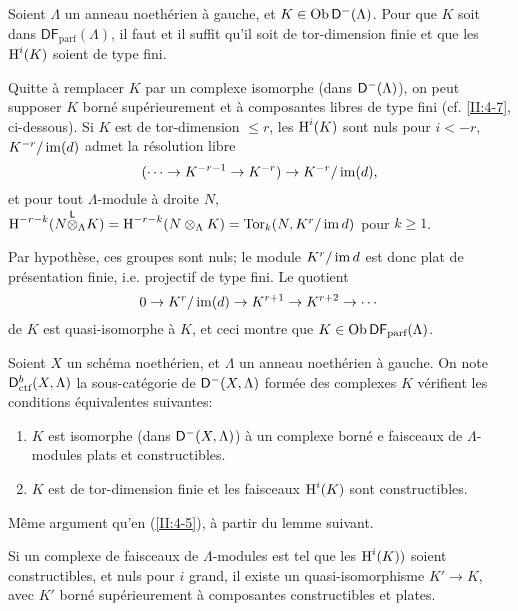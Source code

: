 \documentclass[oneside]{book}
\begin{document}
\begin{lemma}\label{II:4-5-1} 
Soient $\Lambda$ un anneau noethérien à gauche, et $K\in\operatorname{Ob}\mathsf{D}^-(\Lambda)$. 
Pour que $K$ soit dans $\mathsf{DF}_\text{parf}(\Lambda)$, il faut et il suffit 
qu'il soit de tor-dimension finie et que les $\operatorname{H}^i(K)$ soient de type fini.
\end{lemma}

Quitte à remplacer $K$ par un complexe isomorphe (dans $\mathsf{D}^-(\Lambda)$), on 
peut supposer $K$ borné supérieurement et à composantes libres de type 
fini (cf. \ref{II:4-7}, ci-dessous). Si $K$ est de tor-dimension $\leqslant r$, 
les $\operatorname{H}^i(K)$ sont nuls pour $i<-r$, $K^{-r}/\operatorname{im}(d)$ admet la résolution 
libre 
\[
  (\cdots \to K^{-r-1} \to K^{-r}) \to K^{-r}/\operatorname{im}(d) \text{,}
\]
et pour tout $\Lambda$-module à droite $N$, 
$\operatorname{H}^{-r-k}(N{\overset{\mathsf{L}}{\otimes}}_\Lambda K) = \operatorname{H}^{-r-k}(N\otimes_\Lambda K) 
= \operatorname{Tor}_k(N,K^r/\operatorname{im} d)$ pour $k\geqslant 1$. 

Par hypothèse, ces groupes sont nuls; le module $K^r/\operatorname{im} d$ est donc plat de 
présentation finie, i.e. projectif de type fini. Le quotient 
\[
  0 \to K^r/\operatorname{im}(d) \to K^{r+1} \to K^{r+2}\to \cdots 
\]
de $K$ est quasi-isomorphe à $K$, et ceci montre que 
$K\in\operatorname{Ob}\mathsf{DF}_\text{parf}(\Lambda)$. 





\begin{prop-def_}\label{II:4-6}
Soient $X$ un sch\'ema noeth\'erien, et $\Lambda$ un anneau noeth\'erien \`a 
gauche. On note $\mathsf{D}_\textnormal{ctf}^b(X,\Lambda)$ la sous-cat\'egorie de 
$\mathsf{D}^-(X,\Lambda)$ form\'ee des complexes $K$ v\'erifient les conditions 
\'equivalentes suivantes:
\begin{enumerate}[\indent i)]
  \item $K$ est isomorphe (dans $\mathsf{D}^-(X,\Lambda)$) \`a un complexe born\'e e 
    faisceaux de $\Lambda$-modules plats et constructibles. 
  \item $K$ est de tor-dimension finie et les faisceaux $\operatorname{H}^i(K)$ sont 
    constructibles. 
\end{enumerate}
\end{prop-def_}

M\^eme argument qu'en (\ref{II:4-5}), \`a partir du lemme suivant. 





\begin{lemma_}\label{II:4-7}
Si un complexe de faisceaux de $\Lambda$-modules est tel que les $\operatorname{H}^i(K))$ 
soient constructibles, et nuls pour $i$ grand, il existe un 
quasi-isomorphisme $K'\to K$, avec $K'$ born\'e sup\'erieurement \`a 
composantes constructibles et plates.
\end{lemma_}
\end{document}

